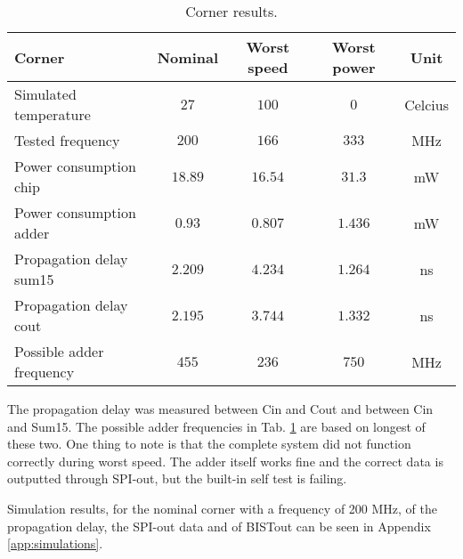 \begin{table}[H]
	\caption{Corner results.}
	\centering
	\begin{tabular}{| l | c | c | c | c |}
		\hline
		Corner & Nominal & Worst speed & Worst power & Unit\\
		\hline
		Simulated temperature & $27$ & $100$ & $0$ & Celcius\\
		\hline 
		Tested frequency & $200$ & $166$ & $333$ & MHz  \\
		\hline
		Power consumption chip & $18.89$ & $16.54$ & $31.3$ & mW \\
		\hline 
		Power consumption adder & $0.93$ & $0.807$ & $1.436$ & mW \\
		\hline 
		Propagation delay sum15 & $2.209$ & $4.234$ & $1.264$ & ns \\
		\hline 
		Propagation delay cout & $2.195$ & $3.744$ & $1.332$ & ns \\
		\hline
		Possible adder frequency & $455$ & $236$ & $750$ & MHz \\
		\hline
	\end{tabular}
	\label{corner_result}
\end{table}

The propagation delay was measured between Cin and Cout and between Cin and Sum15. The possible adder frequencies in Tab. \ref{corner_result} are based on longest of these two. One thing to note is that the complete system did not function correctly during worst speed. The adder itself works fine and the correct data is outputted through SPI-out, but the built-in self test is failing.

Simulation results, for the nominal corner with a frequency of 200 MHz, of the propagation delay, the SPI-out data and of BISTout can be seen in Appendix \ref{app:simulations}.
